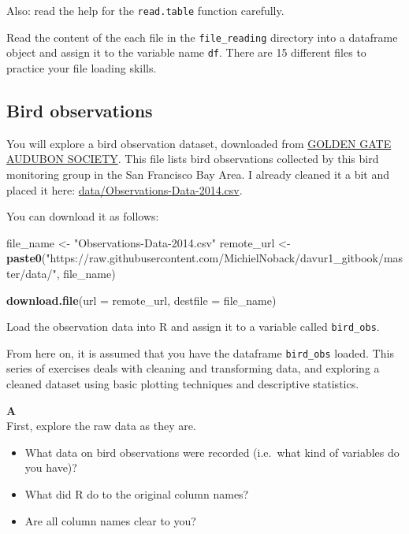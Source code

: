 \documentclass[]{book}
\newenvironment{Shaded}{\begin{snugshade}}{\end{snugshade}}
\newcommand{\DataTypeTok}[1]{\textcolor[rgb]{0.13,0.29,0.53}{#1}}
\newcommand{\KeywordTok}[1]{\textcolor[rgb]{0.13,0.29,0.53}{\textbf{#1}}}
\newcommand{\NormalTok}[1]{#1}
\newcommand{\StringTok}[1]{\textcolor[rgb]{0.31,0.60,0.02}{#1}}
\providecommand{\tightlist}{%
  \setlength{\itemsep}{0pt}\setlength{\parskip}{0pt}}
\begin{document}
Also: read the help for the \texttt{read.table} function carefully.

Read the content of the each file in the \texttt{file\_reading} directory into a dataframe object and assign it to the variable name \texttt{df}. There are 15 different files to practice your file loading skills.

\hypertarget{bird-observations}{%
\subsection{Bird observations}\label{bird-observations}}

You will explore a bird observation dataset, downloaded from \href{http://goldengateaudubon.org/birding-resources/observations/}{GOLDEN GATE AUDUBON SOCIETY}. This file lists bird observations collected by this bird monitoring group in the San Francisco Bay Area. I already cleaned it a bit and placed it here: \url{data/Observations-Data-2014.csv}.

You can download it as follows:

\begin{Shaded}
\begin{Highlighting}[]
\NormalTok{file_name <-}\StringTok{ "Observations-Data-2014.csv"}
\NormalTok{remote_url <-}\StringTok{ }\KeywordTok{paste0}\NormalTok{(}\StringTok{"https://raw.githubusercontent.com/MichielNoback/davur1_gitbook/master/data/"}\NormalTok{, file_name)}

\KeywordTok{download.file}\NormalTok{(}\DataTypeTok{url =}\NormalTok{ remote_url, }\DataTypeTok{destfile =}\NormalTok{ file_name)}
\end{Highlighting}
\end{Shaded}

Load the observation data into R and assign it to a variable called \texttt{bird\_obs}.

From here on, it is assumed that you have the dataframe \texttt{bird\_obs} loaded. This series of exercises deals with cleaning and transforming data, and exploring a cleaned dataset using basic plotting techniques and descriptive statistics.

\textbf{A}\\
First, explore the raw data as they are.

\begin{itemize}
\tightlist
\item
  What data on bird observations were recorded (i.e.~what kind of variables do you have)?
\item
  What did R do to the original column names?
\item
  Are all column names clear to you?
\end{itemize}
\end{document}
